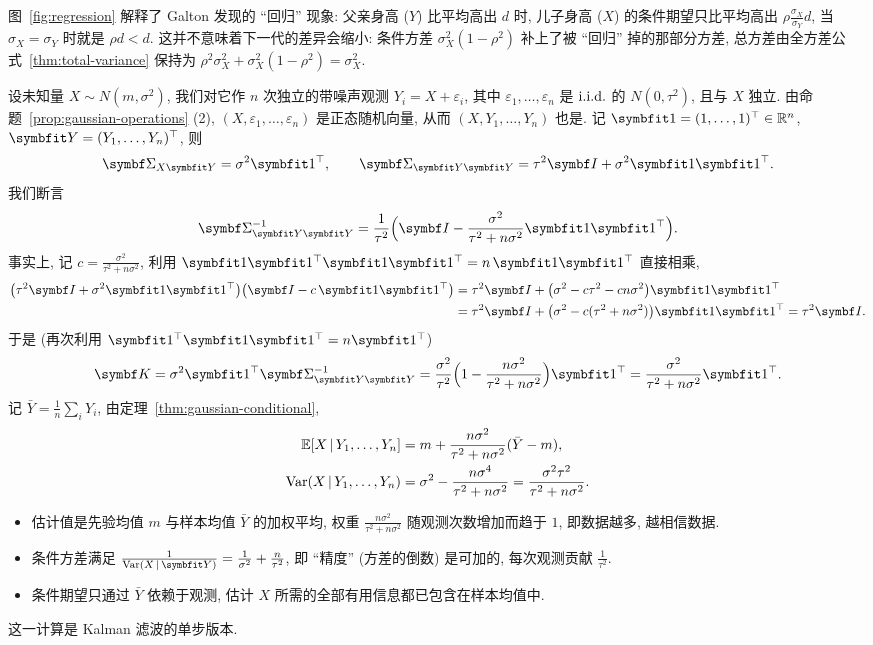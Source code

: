 \begin{intuition}
图~\ref{fig:regression} 解释了 Galton 发现的 ``回归'' 现象: 父亲身高 ($Y$) 比平均高出 $d$ 时, 儿子身高 ($X$) 的条件期望只比平均高出 $\rho\frac{\sigma_X}{\sigma_Y}d$, 当 $\sigma_X=\sigma_Y$ 时就是 $\rho d<d$. 这并不意味着下一代的差异会缩小: 条件方差 $\sigma_X^2(1-\rho^2)$ 补上了被 ``回归'' 掉的那部分方差, 总方差由全方差公式~\ref{thm:total-variance} 保持为 $\rho^2\sigma_X^2+\sigma_X^2(1-\rho^2)=\sigma_X^2$.
\end{intuition}

\begin{example}[带噪声的观测]\label{ex:signal-noise}
设未知量 $X\sim N(m,\sigma^2)$, 我们对它作 $n$ 次独立的带噪声观测 $Y_i=X+\varepsilon_i$, 其中 $\varepsilon_1,\dots,\varepsilon_n$ 是 $\text{i.i.d.}$ 的 $N(0,\tau^2)$, 且与 $X$ 独立. 由命题~\ref{prop:gaussian-operations} (2), $(X,\varepsilon_1,\dots,\varepsilon_n)$ 是正态随机向量, 从而 $(X,Y_1,\dots,Y_n)$ 也是. 记 $\rvec{1}=(1,\dots,1)^\T\in\R^n$, $\rvec{Y}=(Y_1,\dots,Y_n)^\T$, 则
\[
\mat{\Sigma}_{X\rvec{Y}}=\sigma^2\rvec{1}^\T,\qquad \mat{\Sigma}_{\rvec{Y}\rvec{Y}}=\tau^2\mat{I}+\sigma^2\rvec{1}\rvec{1}^\T.
\]
我们断言
\[
\mat{\Sigma}_{\rvec{Y}\rvec{Y}}^{-1}=\frac{1}{\tau^2}\Big(\mat{I}-\frac{\sigma^2}{\tau^2+n\sigma^2}\rvec{1}\rvec{1}^\T\Big).
\]
事实上, 记 $c=\frac{\sigma^2}{\tau^2+n\sigma^2}$, 利用 $\rvec{1}\rvec{1}^\T\rvec{1}\rvec{1}^\T=n\,\rvec{1}\rvec{1}^\T$ 直接相乘,
\begin{align*}
\big(\tau^2\mat{I}+\sigma^2\rvec{1}\rvec{1}^\T\big)\big(\mat{I}-c\,\rvec{1}\rvec{1}^\T\big)
&=\tau^2\mat{I}+\big(\sigma^2-c\tau^2-cn\sigma^2\big)\rvec{1}\rvec{1}^\T\\
&=\tau^2\mat{I}+\big(\sigma^2-c(\tau^2+n\sigma^2)\big)\rvec{1}\rvec{1}^\T=\tau^2\mat{I}.
\end{align*}
于是 (再次利用 $\rvec{1}^\T\rvec{1}\rvec{1}^\T=n\rvec{1}^\T$)
\[
\mat{K}=\sigma^2\rvec{1}^\T\mat{\Sigma}_{\rvec{Y}\rvec{Y}}^{-1}=\frac{\sigma^2}{\tau^2}\Big(1-\frac{n\sigma^2}{\tau^2+n\sigma^2}\Big)\rvec{1}^\T=\frac{\sigma^2}{\tau^2+n\sigma^2}\rvec{1}^\T.
\] 记 $\bar Y=\frac{1}{n}\sum_iY_i$, 由定理~\ref{thm:gaussian-conditional},
\begin{align*}
\mathbb{E}[X\,|\,Y_1,\dots,Y_n]&=m+\frac{n\sigma^2}{\tau^2+n\sigma^2}(\bar Y-m),\\
\operatorname{Var}(X\,|\,Y_1,\dots,Y_n)&=\sigma^2-\frac{n\sigma^4}{\tau^2+n\sigma^2}=\frac{\sigma^2\tau^2}{\tau^2+n\sigma^2}.
\end{align*}
\begin{itemize}
\item 估计值是先验均值 $m$ 与样本均值 $\bar Y$ 的加权平均, 权重 $\frac{n\sigma^2}{\tau^2+n\sigma^2}$ 随观测次数增加而趋于 $1$, 即数据越多, 越相信数据.
\item 条件方差满足 $\frac{1}{\Var(X\,|\,\rvec{Y})}=\frac{1}{\sigma^2}+\frac{n}{\tau^2}$, 即 ``精度'' (方差的倒数) 是可加的, 每次观测贡献 $\frac{1}{\tau^2}$.
\item 条件期望只通过 $\bar Y$ 依赖于观测, 估计 $X$ 所需的全部有用信息都已包含在样本均值中.
\end{itemize}
这一计算是 Kalman 滤波的单步版本.
\end{example}

